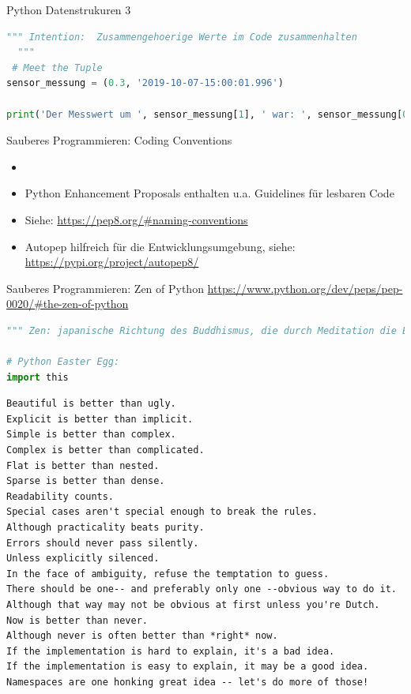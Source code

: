 \begin{frame}[fragile]{Python Datenstrukuren 3}
\begin{lstlisting}[language=Python]
 """ Intention:  Zusammengehoerige Werte im Code zusammenhalten
  """
 # Meet the Tuple
sensor_messung = (0.3, '2019-10-07-15:00:01.996')

print('Der Messwert um ', sensor_messung[1], ' war: ', sensor_messung[0])

\end{lstlisting}
\end{frame}


\begin{frame}[fragile]{Sauberes Programmieren: Coding Conventions}
    \begin{itemize}
    \setlength{\itemindent}{.5in}
     \item [\textbf{ Richtlinien}]
    \end{itemize}
    \begin{itemize}
        \item Python Enhancement Proposals enthalten u.a. Guidelines für lesbaren Code
        \item Siehe: \url{https://pep8.org/#naming-conventions}
        \item Autopep hilfreich für die Entwicklungsumgebung, siehe:  \url{https://pypi.org/project/autopep8/}
     \end{itemize}
\end{frame}



\begin{frame}[fragile]{Sauberes Programmieren: Zen of Python}
\url{https://www.python.org/dev/peps/pep-0020/#the-zen-of-python}
\begin{lstlisting}[language=Python]
""" Zen: japanische Richtung des Buddhismus, die durch Meditation die Erfahrung der Einheit allen Seins und damit tätige Lebenskraft und größte Selbstbeherrschung zu erreichen sucht. """

# Python Easter Egg:
import this
\end{lstlisting}
\begin{lstlisting}
Beautiful is better than ugly.
Explicit is better than implicit.
Simple is better than complex.
Complex is better than complicated.
Flat is better than nested.
Sparse is better than dense.
Readability counts.
Special cases aren't special enough to break the rules.
Although practicality beats purity.
Errors should never pass silently.
Unless explicitly silenced.
In the face of ambiguity, refuse the temptation to guess.
There should be one-- and preferably only one --obvious way to do it.
Although that way may not be obvious at first unless you're Dutch.
Now is better than never.
Although never is often better than *right* now.
If the implementation is hard to explain, it's a bad idea.
If the implementation is easy to explain, it may be a good idea.
Namespaces are one honking great idea -- let's do more of those!
\end{lstlisting}
\end{frame}


